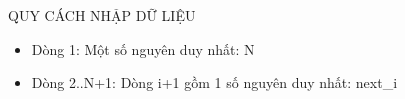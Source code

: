 QUY CÁCH NHẬP DỮ LIỆU  
\begin{itemize}
	\item     Dòng 1: Một số nguyên duy nhất: N   
	\item     Dòng 2..N+1: Dòng i+1 gồm 1 số nguyên duy nhất: next\_i   
\end{itemize}